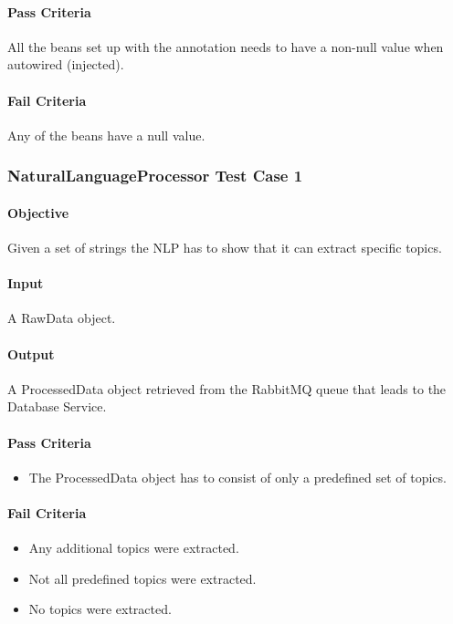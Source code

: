 \documentclass[hidelinks,english]{article}
\begin{document}
			\paragraph{Pass Criteria} All the beans set up with the \emph{\@Bean} annotation needs to have a non-null value when autowired (injected).
			\paragraph{Fail Criteria} Any of the beans have a null value.
			
		\subsubsection{NaturalLanguageProcessor Test Case 1}\label{pprocessortopictest1}
			\paragraph{Objective} Given a set of strings the NLP has to show that it can extract specific topics.
			\paragraph{Input} A RawData object.
			\paragraph{Output} A ProcessedData object retrieved from the RabbitMQ queue that leads to the Database Service.
			\paragraph{Pass Criteria}
			\begin{itemize}
				\item The ProcessedData object has to consist of only a predefined set of topics.
			\end{itemize}
			\paragraph{Fail Criteria}
			\begin{itemize}
				\item Any additional topics were extracted.
				\item Not all predefined topics were extracted.
				\item No topics were extracted.
			\end{itemize}
	
\end{document}
